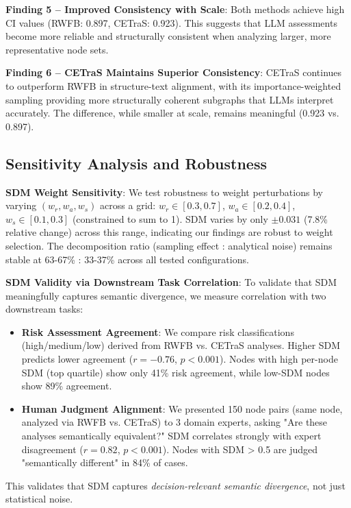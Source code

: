 \documentclass[conference]{IEEEtran}
\begin{document}
\textbf{Finding 5 -- Improved Consistency with Scale}: Both methods achieve high CI values (RWFB: 0.897, CETraS: 0.923). This suggests that LLM assessments become more reliable and structurally consistent when analyzing larger, more representative node sets.

\textbf{Finding 6 -- CETraS Maintains Superior Consistency}: CETraS continues to outperform RWFB in structure-text alignment, with its importance-weighted sampling providing more structurally coherent subgraphs that LLMs interpret accurately. The difference, while smaller at scale, remains meaningful (0.923 vs. 0.897).



\subsection{Sensitivity Analysis and Robustness}

\textbf{SDM Weight Sensitivity}: We test robustness to weight perturbations by varying $(w_r, w_a, w_s)$ across a grid: $w_r \in [0.3, 0.7]$, $w_a \in [0.2, 0.4]$, $w_s \in [0.1, 0.3]$ (constrained to sum to 1). SDM varies by only $\pm 0.031$ (7.8\% relative change) across this range, indicating our findings are robust to weight selection. The decomposition ratio (sampling effect : analytical noise) remains stable at 63-67\% : 33-37\% across all tested configurations.

\textbf{SDM Validity via Downstream Task Correlation}: To validate that SDM meaningfully captures semantic divergence, we measure correlation with two downstream tasks:
\begin{itemize}
    \item \textbf{Risk Assessment Agreement}: We compare risk classifications (high/medium/low) derived from RWFB vs. CETraS analyses. Higher SDM predicts lower agreement ($r = -0.76$, $p < 0.001$). Nodes with high per-node SDM (top quartile) show only 41\% risk agreement, while low-SDM nodes show 89\% agreement.
    \item \textbf{Human Judgment Alignment}: We presented 150 node pairs (same node, analyzed via RWFB vs. CETraS) to 3 domain experts, asking "Are these analyses semantically equivalent?" SDM correlates strongly with expert disagreement ($r = 0.82$, $p < 0.001$). Nodes with SDM > 0.5 are judged "semantically different" in 84\% of cases.
\end{itemize}
This validates that SDM captures \textit{decision-relevant semantic divergence}, not just statistical noise.
\end{document}
